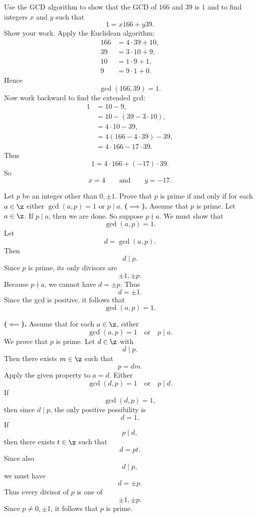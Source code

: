 \begin{problem}{
    Use the GCD algorithm to show that the GCD of $166$ and $39$ is $1$ and to find integers $x$ and $y$ such that
    \[
        1=x166+y39.
    \]
    Show your work.
}
    Apply the Euclidean algorithm:
    \begin{align*}
        166 &= 4\cdot 39 + 10,\\
        39 &= 3\cdot 10 + 9,\\
        10 &= 1\cdot 9 + 1,\\
        9 &= 9\cdot 1 + 0.
    \end{align*}
    Hence
    \[
        \gcd(166,39)=1.
    \]
    Now work backward to find the extended gcd:
    \begin{align*}
        1 &= 10-9,\\
        &= 10-(39-3\cdot 10),\\
        &= 4\cdot 10-39,\\
        &= 4(166-4\cdot 39)-39,\\
        &= 4\cdot 166-17\cdot 39.
    \end{align*}
    Thus
    \[
        1=4\cdot 166+(-17)\cdot 39.
    \]
    So
    \[
        x=4
        \qquad\text{and}\qquad
        y=-17.
    \]
\end{problem}

\begin{problem}{
    Let $p$ be an integer other than $0,\pm 1$.
    Prove that $p$ is prime if and only if for each $a\in\z$ either $\gcd(a,p)=1$ or $p\mid a$.
}
    \textbf{($\implies$).}
    Assume that $p$ is prime.
    Let $a\in\z$.
    If $p\mid a$, then we are done.
    So suppose $p\nmid a$.
    We must show that
    \[
        \gcd(a,p)=1.
    \]
    Let
    \[
        d=\gcd(a,p).
    \]
    Then
    \[
        d\mid p.
    \]
    Since $p$ is prime, its only divisors are
    \[
        \pm 1,\pm p.
    \]
    Because $p\nmid a$, we cannot have $d=\pm p$.
    Thus
    \[
        d=\pm 1.
    \]
    Since the gcd is positive, it follows that
    \[
        \gcd(a,p)=1.
    \]

    \textbf{($\impliedby$).}
    Assume that for each $a\in\z$, either
    \[
        \gcd(a,p)=1
        \quad\text{or}\quad
        p\mid a.
    \]
    We prove that $p$ is prime.
    Let $d\in\z$ with
    \[
        d\mid p.
    \]
    Then there exists $m\in\z$ such that
    \[
        p=dm.
    \]
    Apply the given property to $a=d$.
    Either
    \[
        \gcd(d,p)=1
        \quad\text{or}\quad
        p\mid d.
    \]
    If
    \[
        \gcd(d,p)=1,
    \]
    then since $d\mid p$, the only positive possibility is
    \[
        d=1.
    \]
    If
    \[
        p\mid d,
    \]
    then there exists $t\in\z$ such that
    \[
        d=pt.
    \]
    Since also
    \[
        d\mid p,
    \]
    we must have
    \[
        d=\pm p.
    \]
    Thus every divisor of $p$ is one of
    \[
        \pm 1,\pm p.
    \]
    Since $p\neq 0,\pm 1$, it follows that $p$ is prime.
\end{problem}


